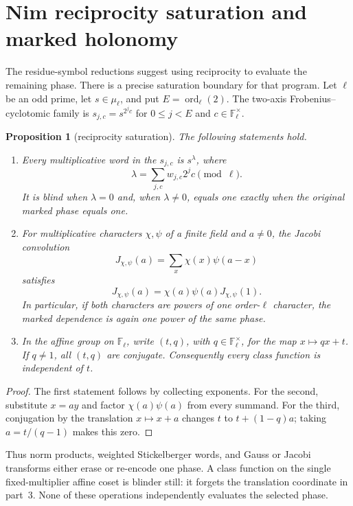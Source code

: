 \documentclass[11pt]{article}
\newtheorem{proposition}[theorem]{Proposition}
\theoremstyle{definition}
\theoremstyle{remark}
\begin{document}
\section{Nim reciprocity saturation and marked holonomy}
\label{sec:nim-reciprocity}

The residue-symbol reductions suggest using reciprocity to evaluate the
remaining phase.  There is a precise saturation boundary for that program.
Let $\ell$ be an odd prime, let $s\in\mu_\ell$, and put
$E=\operatorname{ord}_\ell(2)$.  The two-axis Frobenius--cyclotomic family
is $s_{j,c}=s^{2^j c}$ for $0\leq j<E$ and
$c\in\mathbb F_\ell^\times$.

\begin{proposition}[reciprocity saturation]\label{prop:reciprocity-saturation}
The following statements hold.
\begin{enumerate}
\item Every multiplicative word in the $s_{j,c}$ is $s^\lambda$, where
\[
 \lambda=\sum_{j,c}w_{j,c}2^jc\pmod\ell.
\]
It is blind when $\lambda=0$ and, when $\lambda\ne0$, equals one exactly when
the original marked phase equals one.
\item For multiplicative characters $\chi,\psi$ of a finite field and
$a\ne0$, the Jacobi convolution
\[
 J_{\chi,\psi}(a)=\sum_x\chi(x)\psi(a-x)
\]
satisfies
\[
 J_{\chi,\psi}(a)=\chi(a)\psi(a)J_{\chi,\psi}(1).
\]
In particular, if both characters are powers of one order-$\ell$ character,
the marked dependence is again one power of the same phase.
\item In the affine group on $\mathbb F_\ell$, write $(t,q)$, with
$q\in\mathbb F_\ell^\times$, for the map $x\mapsto qx+t$.  If $q\ne1$, all
$(t,q)$ are conjugate.  Consequently every class function is independent of
$t$.
\end{enumerate}
\end{proposition}

\begin{proof}
The first statement follows by collecting exponents.  For the second,
substitute $x=ay$ and factor $\chi(a)\psi(a)$ from every summand.  For the
third, conjugation by the translation $x\mapsto x+a$ changes $t$ to
$t+(1-q)a$; taking $a=t/(q-1)$ makes this zero.
\end{proof}

Thus norm products, weighted Stickelberger words, and Gauss or Jacobi
transforms either erase or re-encode one phase.  A class function on the
single fixed-multiplier affine coset is blinder still: it forgets the
translation coordinate in part~3.  None of these operations independently
evaluates the selected phase.
\end{document}
